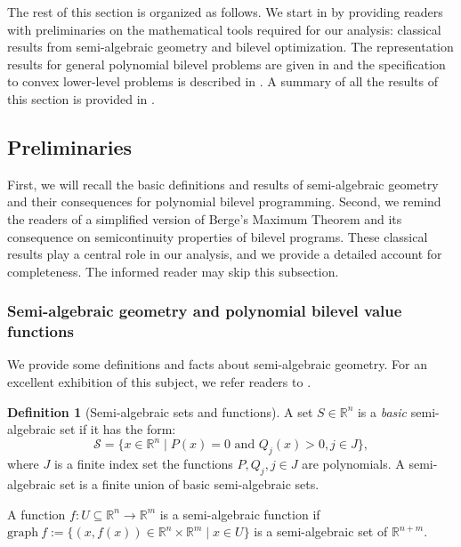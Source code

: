 \documentclass{article}
\newcommand*{\cS}{\mathcal{S}}
\newcommand*{\RR}{\mathbb{R}}
\newcommand{\graph}{\mathrm{graph}\ }
\newcommand{\TL}[1]{\textcolor{red}{#1}}
\theoremstyle{plain}
\theoremstyle{definition}
\newtheorem{definition}[theorem]{Definition}
\begin{document}

The rest of this section is organized as follows. We start in  by providing readers with preliminaries on the mathematical tools required for our analysis: classical results from semi-algebraic geometry and bilevel optimization. The representation results for general polynomial bilevel problems are given in  and the specification to convex lower-level problems is described in . A summary of all the results of this section is provided in .


\subsection{Preliminaries}
\label{sec:preliminaries}
First, we will recall the basic definitions and results of semi-algebraic geometry and their consequences for polynomial bilevel programming. Second, we remind the readers of a simplified version of Berge's Maximum Theorem \cite[Section 6.3]{maximum_theorem} and its consequence on semicontinuity properties of bilevel programs. These classical results play a central role in our analysis, and we provide a detailed account for completeness. The informed reader may skip this subsection.

\subsubsection*{Semi-algebraic geometry and polynomial bilevel value functions} 
We provide some definitions and facts about semi-algebraic geometry. For an excellent exhibition of this subject, we refer readers to \cite{realgeoalg}.

\begin{definition}[Semi-algebraic sets and functions]
    \label{def:semi-algebraic-set}
    A set $S \in \RR^n$ is a \emph{basic} semi-algebraic set if it has the form:
    \begin{equation*}
        \cS = \{x \in \RR^n \mid P(x) = 0 \text{ and } Q_{j}(x) > 0, j \in J\},
    \end{equation*}
    where $J$ is a finite index set the functions $P, Q_{j}, j \in J$ are polynomials. A semi-algebraic set is a finite union of basic semi-algebraic sets.  
    
    A function $f: U \subseteq \RR^n \to \RR^m$ is a semi-algebraic function if $\graph f:=\{(x,f(x)) \in \RR^n \times \RR^m \mid x \in U\}$ is a semi-algebraic set of $\RR^{n + m}$. 
\end{definition}
\end{document}
